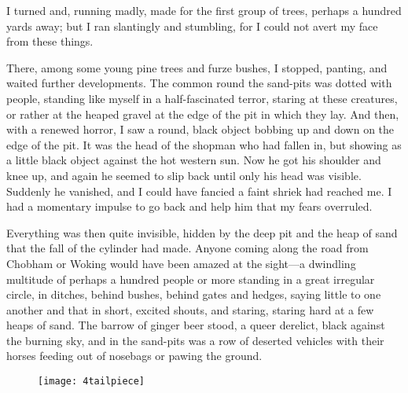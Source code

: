 I turned and, running madly, made for the first group of trees, perhaps a hundred yards away; but I ran slantingly and stumbling, for I could not avert my face from these things.

There, among some young pine trees and furze bushes, I stopped, panting, and waited further developments. The common round the sand-pits was dotted with people, standing like myself in a half-fascinated terror, staring at these creatures, or rather at the heaped gravel at the edge of the pit in which they lay. And then, with a renewed horror, I saw a round, black object bobbing up and down on the edge of the pit. It was the head of the shopman who had fallen in, but showing as a little black object against the hot western sun. Now he got his shoulder and knee up, and again he seemed to slip back until only his head was visible. Suddenly he vanished, and I could have fancied a faint shriek had reached me. I had a momentary impulse to go back and help him that my fears overruled.

Everything was then quite invisible, hidden by the deep pit and the heap of sand that the fall of the cylinder had made. Anyone coming along the road from Chobham or Woking would have been amazed at the sight—a dwindling multitude of perhaps a hundred people or more standing in a great irregular circle, in ditches, behind bushes, behind gates and hedges, saying little to one another and that in short, excited shouts, and staring, staring hard at a few heaps of sand. The barrow of ginger beer stood, a queer derelict, black against the burning sky, and in the sand-pits was a row of deserted vehicles with their horses feeding out of nosebags or pawing the ground.

\begin{figure}[b!]
\centering
\texttt{[image: 4tailpiece]}
\end{figure}